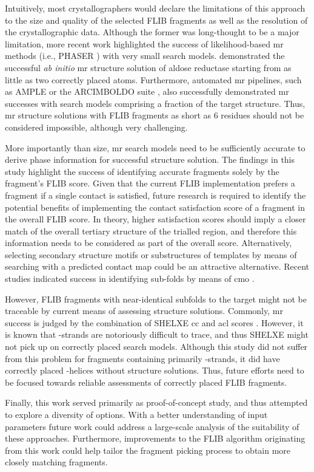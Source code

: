 Intuitively, most crystallographers would declare the limitations of this approach to the size and quality of the selected FLIB fragments as well as the resolution of the crystallographic data. Although the former was long-thought to be a major limitation, more recent work highlighted the success of likelihood-based \gls{mr} methods (i.e., PHASER \cite{McCoy2007-bf}) with very small search models. \textcite{McCoy2017-wh} demonstrated the successful \textit{ab initio} \gls{mr} structure solution of aldose reductase starting from as little as two correctly placed atoms. Furthermore, automated \gls{mr} pipelines, such as AMPLE \cite{Bibby2012-vg} or the ARCIMBOLDO suite \cite{Millan2015-ih}, also successfully demonstrated \gls{mr} successes with search models comprising a fraction of the target structure. Thus, \gls{mr} structure solutions with FLIB fragments as short as 6 residues should not be considered impossible, although very challenging.

More importantly than size, \gls{mr} search models need to be sufficiently accurate to derive phase information for successful structure solution. The findings in this study highlight the success of identifying accurate fragments solely by the fragment's FLIB score. Given that the current FLIB implementation prefers a fragment if a single contact is satisfied, future research is required to identify the potential benefits of implementing the contact satisfaction score of a fragment in the overall FLIB score. In theory, higher satisfaction scores should imply a closer match of the overall tertiary structure of the trialled region, and therefore this information needs to be considered as part of the overall score. Alternatively, selecting secondary structure motifs or substructures of templates by means of searching with a predicted contact map could be an attractive alternative. Recent studies indicated success in identifying sub-folds by means of \gls{cmo} \cite{Buchan2017-sy,Ovchinnikov2017-ma}.

However, FLIB fragments with near-identical subfolds to the target might not be traceable by current means of assessing structure solutions. Commonly, \gls{mr} success is judged by the combination of SHELXE \gls{cc} and \gls{acl} scores \cite{Thorn2013-ir}. However, it is known that \textbeta-strands are notoriously difficult to trace, and thus SHELXE might not pick up on correctly placed search models. Although this study did not suffer from this problem for fragments containing primarily \textbeta-strands, it did have correctly placed \textalpha-helices without structure solutions. Thus, future efforts need to be focused towards reliable assessments of correctly placed FLIB fragments.    

Finally, this work served primarily as proof-of-concept study, and thus attempted to explore a diversity of options. With a better understanding of input parameters future work could address a large-scale analysis of the suitability of these approaches. Furthermore, improvements to the FLIB algorithm originating from this work could help tailor the fragment picking process to obtain more closely matching fragments.
